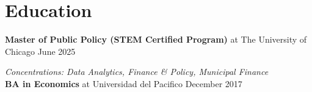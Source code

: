 \renewcommand{\subsection}[3]{
    \noindent\textbf{#1}  {#2} \hfill #3 \break
}
\section{Education}
\subsection{Master of Public Policy (STEM Certified Program)}{at The University of Chicago}{June 2025}
\textit{Concentrations: Data Analytics, Finance \& Policy, Municipal Finance}\\
\subsection{BA in Economics}{at Universidad del Pacifico 
}{December 2017}
\

\vspace{-0.6cm}